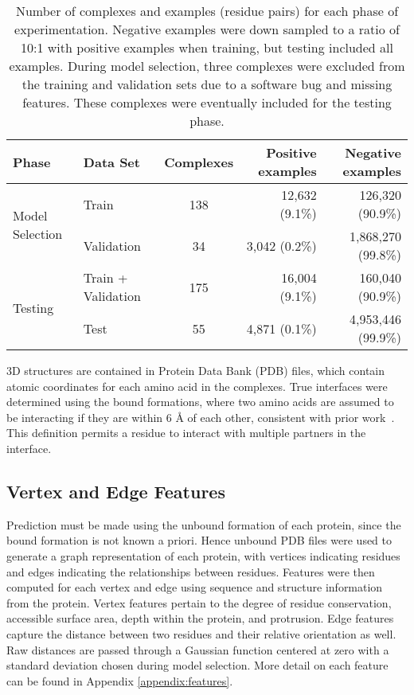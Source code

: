 \begin{table}
	\centering
	\begin{tabular}{l l c r r}
		\toprule
		Phase & Data Set & Complexes & Positive examples  & Negative examples \\ 
		\midrule
		\multirow{2}{*}{Model Selection} 
			& Train      & 138       & 12,632 (9.1\%)     & 126,320 (90.9\%) \\
			& Validation & 34        & 3,042 (0.2\%) 		& 1,868,270 (99.8\%) \\
		\midrule
		\multirow{2}{*}{Testing}
			& Train + Validation & 175 & 16,004 (9.1\%) & 160,040 (90.9\%) \\
			& Test       & 55        & 4,871 (0.1\%)      & 4,953,446 (99.9\%) \\ 
		\bottomrule
	\end{tabular}
	\caption{Number of complexes and examples (residue pairs) for each phase of experimentation. Negative examples were down sampled to a ratio of 10:1 with positive examples when training, but testing included all examples. During model selection, three complexes were excluded from the training and validation sets due to a software bug and missing features. These complexes were eventually included for the testing phase. \label{tab:dataset_size}}
	\label{tab:examples}
\end{table}

3D structures are contained in Protein Data Bank (PDB) files, which contain atomic coordinates for each amino acid in the complexes.
True interfaces were determined using the bound formations, where two amino acids are assumed to be interacting if they are within 6 \AA{} of each other, consistent with prior work~\cite{ofran2007, ahmad2011, minhas2014}.
This definition permits a residue to interact with multiple partners in the interface.

\subsection{Vertex and Edge Features}
Prediction must be made using the unbound formation of each protein, since the bound formation is not known a priori.
Hence unbound PDB files were used to generate a graph representation of each protein, with vertices indicating residues and edges indicating the relationships between residues.
Features were then computed for each vertex and edge using sequence and structure information from the protein.
Vertex features pertain to the degree of residue conservation, accessible surface area, depth within the protein, and protrusion.
Edge features capture the distance between two residues and their relative orientation as well.
Raw distances are passed through a Gaussian function centered at zero with a standard deviation chosen during model selection.
More detail on each feature can be found in Appendix \ref{appendix:features}.


